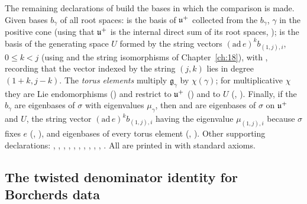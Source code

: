 The remaining declarations of  build the bases in which the comparison is made.
Given bases $b_\gamma$ of all root spaces:  is the basis of $\mathfrak{u}^+$ collected from the $b_\gamma$,
$\gamma$ in the positive cone (using that $\mathfrak{u}^+$ is the internal direct sum of its root spaces,
);  is the basis of the generating space $U$ formed by the string vectors
$(\mathrm{ad}\,e)^k b_{(1,j),i}$, $0\le k<j$ (using  and the string isomorphisms of
Chapter~\ref{ch:18}), with ,  recording that the vector indexed by the string
$(j,k)$ lies in degree $(1+k,j-k)$.  The \emph{torus elements}  multiply $\mathfrak g_\gamma$ by $\chi(\gamma)$;
for multiplicative $\chi$ they are Lie endomorphisms () and restrict to $\mathfrak{u}^+$
() and to $U$ (, ).  Finally, if the $b_\gamma$ are
eigenbases of $\sigma$ with eigenvalues $\mu_\gamma$, then  and  are eigenbases of $\sigma$ on
$\mathfrak{u}^+$ and $U$, the string vector $(\mathrm{ad}\,e)^kb_{(1,j),i}$ having the eigenvalue $\mu_{(1,j),i}$ because $\sigma$ fixes $e$
(, ), and eigenbases of every torus element
(, ).  Other supporting declarations:
, , ,
, , , ,
, , , .  All are printed in
 with standard axioms.

\subsection{The twisted denominator identity for Borcherds data}

